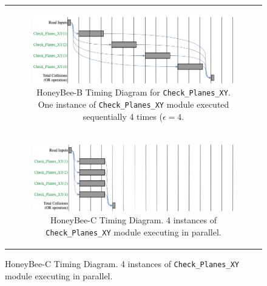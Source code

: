 \begin{figure}[H]
\begin{centering}
\begin{tabular}{c}

\begin{subfigure}{0.97\textwidth}
\includegraphics[width=\linewidth]{chapters/chapter3/img/timing3.png}
\caption{HoneyBee-B Timing Diagram for \texttt{Check\_Planes\_XY}. One instance of \texttt{Check\_Planes\_XY} module executed sequentially 4 times ($\epsilon=4$.}
\label{fig:hbc_timing_a}
\end{subfigure} \\

\begin{subfigure}{0.97\textwidth}
\includegraphics[width=\linewidth]{chapters/chapter3/img/timing4.png}
\caption{HoneyBee-C Timing Diagram. 4 instances of \texttt{Check\_Planes\_XY} module executing in parallel.}
\label{fig:hbc_timing_b}
\end{subfigure} \\

\end{tabular}
\label{fig:hbc_timing}
\end{centering}
\end{figure}